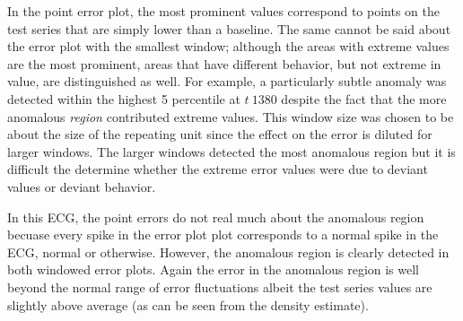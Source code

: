 In the point error plot, the most prominent values correspond to points on the test series that are simply lower than a baseline.
%
The same cannot be said about the error plot with the smallest window;
%
although the areas with extreme values are the most prominent, areas that have different behavior, but not extreme in value, are distinguished as well.
%
For example, a particularly subtle anomaly was detected within the highest 5 percentile at $t~1380$ despite the fact that the more anomalous \emph{region} contributed extreme values.
%
This window size was chosen to be about the size of the repeating unit since the effect on the error is diluted for larger windows.
%
The larger windows detected the most anomalous region but it is difficult the determine whether the extreme error values were due to deviant values or deviant behavior.



In this ECG, the point errors do not real much about the anomalous region becuase every spike in the error plot plot corresponds to a normal spike in the ECG, normal or otherwise.
%
However, the anomalous region is clearly detected in both windowed error plots.
%
Again the error in the anomalous region is well beyond the normal range of error fluctuations albeit the test series values are slightly above average (as can be seen from the density estimate).





